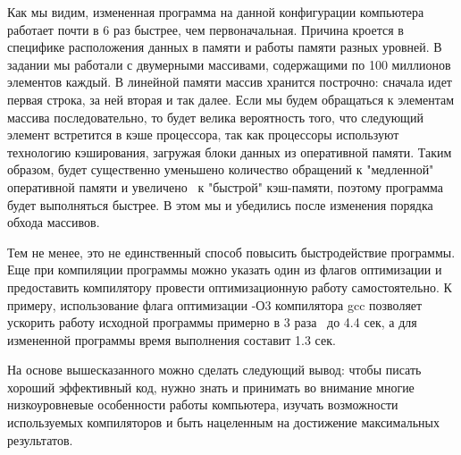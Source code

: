 \documentclass[12pt, a4paper, fleqn]{article}
\begin{document}
\justifying
\hspace{0.4 cm}
Как мы видим, измененная программа на данной конфигурации компьютера работает почти в 6 раз быстрее, чем первоначальная. Причина кроется в специфике расположения данных в памяти и работы памяти разных уровней. В задании мы работали с двумерными массивами, содержащими по 100 миллионов элементов каждый. В линейной памяти массив хранится построчно: сначала идет первая строка, за ней вторая и так далее. Если мы будем обращаться к элементам массива последовательно, то будет велика вероятность того, что следующий элемент встретится в кэше процессора, так как процессоры используют технологию кэширования, загружая блоки данных из оперативной памяти. Таким образом, будет существенно уменьшено количество обращений к "медленной" оперативной памяти и увеличено \textemdash ~к "быстрой" кэш-памяти, поэтому программа будет выполняться быстрее. В этом мы и убедились после изменения порядка обхода массивов. \par
Тем не менее, это не единственный способ повысить быстродействие программы. Еще при компиляции программы можно указать один из флагов оптимизации и предоставить компилятору провести оптимизационную работу самостоятельно. К примеру, использование флага оптимизации -О3 компилятора gcc позволяет ускорить работу исходной программы примерно в 3 раза \textemdash ~до 4.4 сек, а для измененной программы время выполнения составит 1.3 сек. \par
На основе вышесказанного можно сделать следующий вывод: чтобы писать хороший эффективный код, нужно знать и принимать во внимание многие низкоуровневые особенности работы компьютера, изучать возможности используемых компиляторов и быть нацеленным на достижение максимальных результатов.
\end{document}
